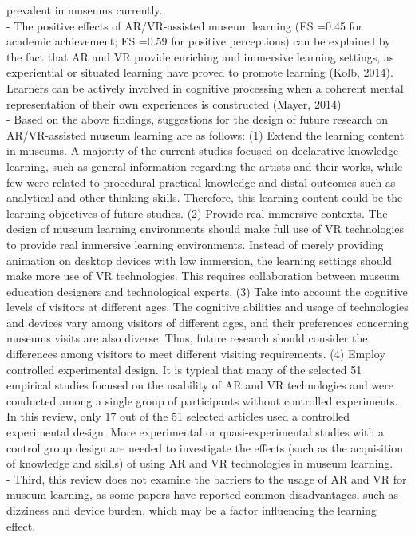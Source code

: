 prevalent in museums currently.
\\
- The positive effects of AR/VR-assisted museum learning (ES =0.45 for academic achievement; ES =0.59 for positive perceptions)
can be explained by the fact that AR and VR provide enriching and immersive learning settings, as experiential or situated learning
have proved to promote learning (Kolb, 2014). Learners can be actively involved in cognitive processing when a coherent mental
representation of their own experiences is constructed (Mayer, 2014)
\\
- Based on the above findings, suggestions for the design of future research on AR/VR-assisted museum learning are as follows:
(1) Extend the learning content in museums. A majority of the current studies focused on declarative knowledge learning, such as
general information regarding the artists and their works, while few were related to procedural-practical knowledge and distal
outcomes such as analytical and other thinking skills. Therefore, this learning content could be the learning objectives of future
studies.
(2) Provide real immersive contexts. The design of museum learning environments should make full use of VR technologies to
provide real immersive learning environments. Instead of merely providing animation on desktop devices with low immersion,
the learning settings should make more use of VR technologies. This requires collaboration between museum education designers
and technological experts.
(3) Take into account the cognitive levels of visitors at different ages. The cognitive abilities and usage of technologies and devices
vary among visitors of different ages, and their preferences concerning museums visits are also diverse. Thus, future research
should consider the differences among visitors to meet different visiting requirements.
(4) Employ controlled experimental design. It is typical that many of the selected 51 empirical studies focused on the usability of AR
and VR technologies and were conducted among a single group of participants without controlled experiments. In this review,
only 17 out of the 51 selected articles used a controlled experimental design. More experimental or quasi-experimental studies
with a control group design are needed to investigate the effects (such as the acquisition of knowledge and skills) of using AR
and VR technologies in museum learning.
\\
- Third, this review does not examine the barriers to the usage of AR and VR for museum learning, as some papers
have reported common disadvantages, such as dizziness and device burden, which may be a factor influencing the learning effect.
